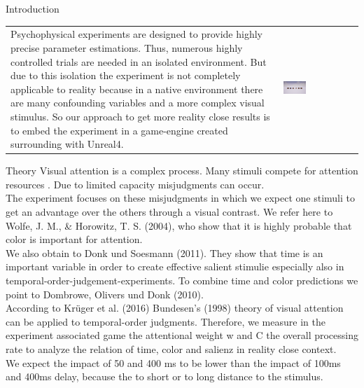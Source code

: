 \documentclass[a0paper,portrait]{baposter}
\begin{document}
\begin{poster}
{		}
		
		
		
		\begin{posterbox}[name=intro,span=2,column=0,row=0]{Introduction}
			\begin{tabular}{p{} p{}}
				Psychophysical experiments are designed to provide highly precise parameter estimations. Thus, numerous highly controlled trials are needed in an isolated environment. But due to this isolation the experiment is not completely applicable to reality because in a native environment there are many confounding variables and a more complex visual stimulus.
				So our approach to get more reality close results is to embed the experiment in a game-engine created surrounding with Unreal4.
				& 
				\vspace{-5pt}
				\includegraphics[width=0.32\textwidth]{Screenshots/playerDecision.png}\\
			\end{tabular}
			
		\end{posterbox}
		
		\begin{posterbox}[name=theory,column=0,row=1,below=intro]{Theory}
			\vspace{10pt}
			Visual attention is a complex process. Many stimuli compete for attention resources . Due to limited capacity misjudgments can occur.\\ The experiment focuses on these misjudgments in which we expect one stimuli to get an advantage over the others through a visual contrast. We refer here to Wolfe, J. M., \& Horowitz, T. S. (2004), who show that it is highly probable that color is important for attention.\\
			 We also obtain to Donk und Soesmann (2011). They show that time is an important variable in order to create effective salient stimulie especially also in temporal-order-judgement-experiments. To combine time and color predictions we point to Dombrowe, Olivers und Donk (2010).\\ According to Krüger et al. (2016) Bundesen's (1998) theory of visual attention can be applied to temporal-order judgments. Therefore, we measure in the experiment associated game the attentional weight w and C the overall processing rate to analyze the relation of time, color and salienz in reality close context.\\
			 We expect the impact of 50 and 400 ms to be lower than the impact of 100ms and 400ms delay, because the to short or to long distance to the stimulus.
			 \vspace{18pt}
		\end{posterbox}
		

\end{poster}
\end{document}
